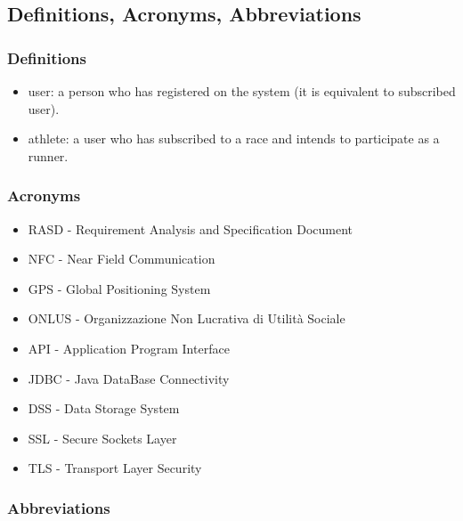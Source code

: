 \subsection{Definitions, Acronyms, Abbreviations}
\subsubsection{Definitions}
\begin{itemize}
\item user: a person who has registered on the system (it is equivalent to subscribed user).
\item athlete: a user who has subscribed to a race and intends to participate as a runner.
\end{itemize}

\subsubsection{Acronyms}
\begin{itemize}
\item RASD - Requirement Analysis and Specification Document
\item NFC - Near Field Communication
\item GPS - Global Positioning System
\item ONLUS - Organizzazione Non Lucrativa di Utilità Sociale
\item API - Application Program Interface
\item JDBC - Java DataBase Connectivity
\item DSS - Data Storage System
\item SSL - Secure Sockets Layer
\item TLS - Transport Layer Security
\end{itemize}

\subsubsection{Abbreviations}
